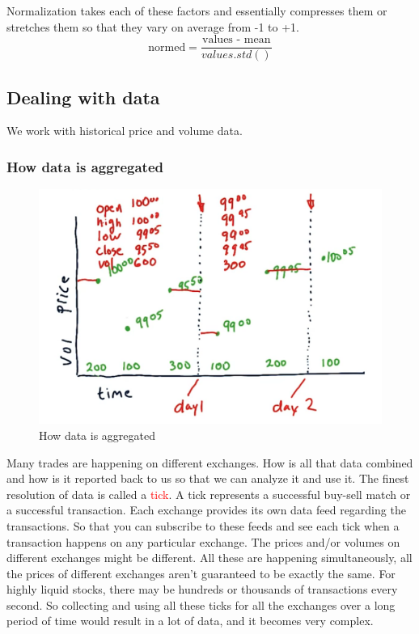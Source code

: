 \documentclass[12pt]{article}
\begin{document}
Normalization takes each of these factors and essentially compresses them or stretches them so that they vary on average from -1 to +1. 
\begin{equation}
\text{normed} = \frac{\text{values - mean}}{values.std()}
\end{equation}

\subsection{Dealing with data}

We work with historical price and volume data. 

\subsubsection{How data is aggregated}

\begin{figure}[!ht]
\centering
\includegraphics[scale=0.5]{fig/fig50}
\caption{How data is aggregated}
\end{figure}

Many trades are happening on different exchanges. How is all that data combined and how is it reported back to us so that we can analyze it and use it. The finest resolution of data is called a \textcolor{red}{tick}. A tick represents a successful buy-sell match or a successful transaction. Each exchange provides its own data feed regarding the transactions. So that you can subscribe to these feeds and see each tick when a transaction happens on any particular exchange. The prices and/or volumes on different exchanges might be different. All these are happening simultaneously, all the prices of different exchanges aren't guaranteed to be exactly the same. For highly liquid stocks, there may be hundreds or thousands of transactions every second. So collecting and using all these ticks for all the exchanges over a long period of time would result in a lot of data, and it becomes very complex. 
\end{document}
